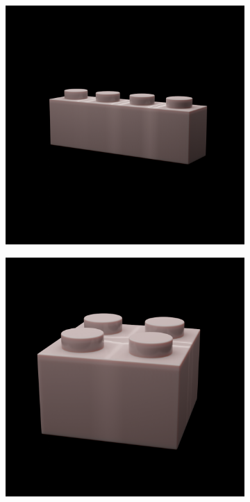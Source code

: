 \documentclass[]{article}
\begin{document}
\begin{figure}[h]
\begin{subfigure}[b]{0.2\textwidth}
    \end{subfigure}
    \begin{subfigure}[b]{0.2\textwidth}
        \includegraphics[width=\textwidth]{generated images/35.png}
    \end{subfigure}
    \begin{subfigure}[b]{0.2\textwidth}
        \includegraphics[width=\textwidth]{generated images/36.png}

\end{subfigure}
\end{figure}
\end{document}
